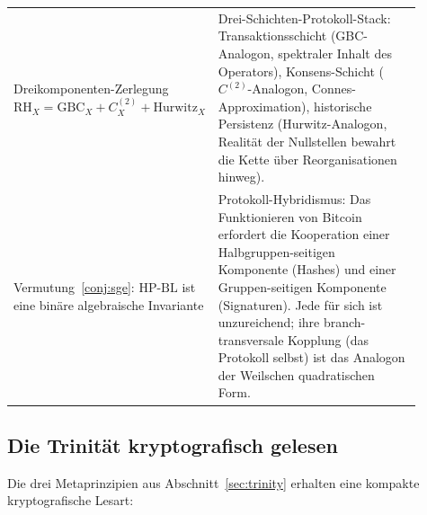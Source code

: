 \documentclass[11pt]{article}
\theoremstyle{definition}
\theoremstyle{remark}
\newcommand{\HBL}{\mathrm{HP\text{-}BL}}
\begin{document}
\begin{center}
\begin{tabular}{@{}p{0.38\linewidth} p{0.52\linewidth}@{}}
Dreikomponenten-Zerlegung
  $\mathrm{RH}_X = \mathrm{GBC}_X + C^{(2)}_X + \mathrm{Hurwitz}_X$
  \cite{Geiger2026RHII} &
Drei-Schichten-Protokoll-Stack: Transaktionsschicht (GBC-Analogon, spektraler
Inhalt des Operators), Konsens-Schicht ($C^{(2)}$-Analogon, Connes-Approximation),
historische Persistenz (Hurwitz-Analogon, Realität der
Nullstellen bewahrt die Kette über Reorganisationen hinweg). \\[0.4ex]

Vermutung~\ref{conj:sge}: $\HBL$ ist eine binäre algebraische Invariante &
Protokoll-Hybridismus: Das Funktionieren von Bitcoin erfordert die Kooperation
einer Halbgruppen-seitigen Komponente (Hashes) und einer Gruppen-seitigen
Komponente (Signaturen). Jede für sich ist unzureichend; ihre
branch-transversale Kopplung (das Protokoll selbst) ist das Analogon der
Weilschen quadratischen Form. \\
\bottomrule
\end{tabular}
\end{center}

\subsection{Die Trinität kryptografisch gelesen}
\label{sec:blockchain-trinity}

Die drei Metaprinzipien aus Abschnitt~\ref{sec:trinity} erhalten eine
kompakte kryptografische Lesart:
\end{document}
